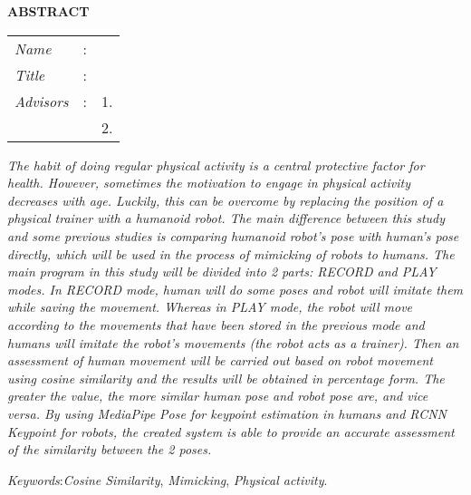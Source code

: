 \begin{center}
  \large\textbf{ABSTRACT}
\end{center}


\vspace{2ex}

\begingroup
\setlength{\tabcolsep}{0pt}

\noindent
\begin{tabularx}{\textwidth}{l >{\centering}m{3em} X}
  \emph{Name}     & : & \name{}         \\

  \emph{Title}    & : & \engtatitle{}   \\

  \emph{Advisors} & : & 1. \advisor{}   \\
                  &   & 2. \coadvisor{} \\
\end{tabularx}
\endgroup

\emph{The habit of doing regular physical activity is a central protective factor for health.
However, sometimes the motivation to engage in physical activity decreases with age.
Luckily, this can be overcome by replacing the position of a physical trainer with a humanoid robot.
The main difference between this study and some previous studies is comparing humanoid robot's pose with human's pose directly, 
which will be used in the process of mimicking of robots to humans.
The main program in this study will be divided into 2 parts: RECORD and PLAY modes. In RECORD mode, human will do some poses and robot will imitate them
while saving the movement. Whereas in PLAY mode, the robot will move according to the movements that have been stored in the previous mode and humans will imitate the robot's movements (the robot acts as a trainer).
Then an assessment of human movement will be carried out based on robot movement using cosine similarity and the results will be obtained in percentage form.
The greater the value, the more similar human pose and robot pose are, and vice versa.
By using MediaPipe Pose for keypoint estimation in humans and RCNN Keypoint for robots, the created system is able to provide an accurate assessment of the similarity between the 2 poses.}

\emph{Keywords}:\emph{Cosine Similarity}, \emph{Mimicking}, \emph{Physical activity}.

